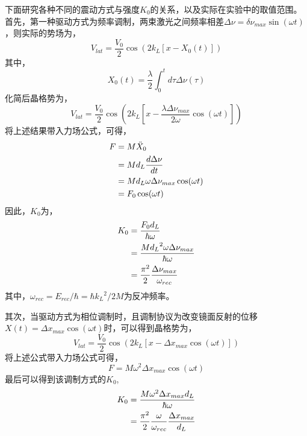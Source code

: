 \documentclass{article}
\begin{document}
	

	下面研究各种不同的震动方式与强度$K_0$的关系，以及实际在实验中的取值范围。
	首先，第一种驱动方式为频率调制，两束激光之间频率相差$\Delta \nu = \delta \nu_{max} \sin(\omega t)$，则实际的势场为，
	\begin{equation}
		V_{lat} = \frac{V_0}{2} \cos(2k_L \left[ x - X_0(t) \right])
	\end{equation}
	其中，
	\begin{equation}
		X_0(t) = \frac{\lambda}{2} \int_0^t d \tau \Delta \nu(\tau)
	\end{equation}
	化简后晶格势为，
	\begin{equation}
		V_{lat} = \frac{V_0}{2} \cos \left( 2k_L \left[ x - \frac{\lambda \Delta \nu_{max}}{2\omega} \cos(\omega t) \right] \right)
	\end{equation}
	将上述结果带入力场公式，可得，
	\begin{align}
		F &= M \ddot{X}_0  \notag \\
		  &= M d_L\frac{d \Delta \nu}{dt} \notag \\
		  &= M d_L \omega \Delta \nu_{max} \cos(\omega t) \notag \\
		  &= F_0 \cos(\omega t)
	\end{align}
	因此，$K_0$为，
	\begin{align}
		K_0 &= \frac{F_0d_L}{\hbar \omega} \notag \\
			&= \frac{M {d_L}^2 \omega \Delta \nu_{max}}{\hbar \omega} \notag \\
			&= \frac{\pi^2}{2} \frac{\Delta \nu_{max}}{\omega_{rec}}
	\end{align}
	其中，$\omega_{rec} = E_{rec}/\hbar = \hbar {k_L}^2 / 2M$为反冲频率。
	
	其次，当驱动方式为相位调制时，且调制协议为改变镜面反射的位移$X(t) = \Delta x_{max} \cos(\omega t)$时，可以得到晶格势为，
	\begin{equation}
		V_{lat} = \frac{V_0}{2} \cos(2k_L \left[ x - \Delta x_{max} \cos(\omega t) \right])
	\end{equation}
	将上述公式带入力场公式可得，
	\begin{equation}
		F = M \omega^2 \Delta x_{max} \cos(\omega t)
	\end{equation}
	最后可以得到该调制方式的$K_0$,
	\begin{align}
		K_0 &= \frac{ M \omega^2 \Delta x_{max} d_L}{\hbar \omega} \notag \\
			&= \frac{\pi^2}{2} \frac{\omega}{\omega_{rec}} \frac{\Delta x_{max}}{d_L}
	\end{align}
\end{document}
